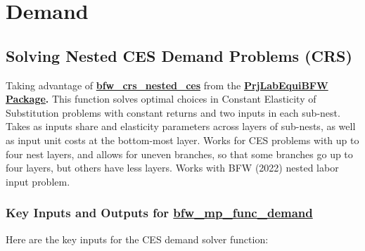 \documentclass[
]{book}
\begin{document}
\hypertarget{demand}{%
\chapter{Demand}\label{demand}}

\hypertarget{solving-nested-ces-demand-problems-crs}{%
\section{Solving Nested CES Demand Problems (CRS)}\label{solving-nested-ces-demand-problems-crs}}

Taking advantage of
\href{https://github.com/FanWangEcon/PrjLabEquiBFW/blob/main/PrjLabEquiBFW/solvedemand/bfw_crs_nested_ces.m}{\textbf{bfw\_crs\_nested\_ces}}
from the \href{https://fanwangecon.github.io/PrjLabEquiBFW/}{\textbf{PrjLabEquiBFW
Package}}\textbf{.} This
function solves optimal choices in Constant Elasticity of Substitution
problems with constant returns and two inputs in each sub-nest. Takes as
inputs share and elasticity parameters across layers of sub-nests, as
well as input unit costs at the bottom-most layer. Works for CES
problems with up to four nest layers, and allows for uneven branches, so
that some branches go up to four layers, but others have less layers.
Works with BFW (2022) nested labor input problem.

\hypertarget{key-inputs-and-outputs-for-bfw_mp_func_demand}{%
\subsection{\texorpdfstring{Key Inputs and Outputs for \href{https://github.com/FanWangEcon/PrjLabEquiBFW/tree/main/PrjLabEquiBFW/func/bfw_mp_func_demand.m}{\textbf{bfw\_mp\_func\_demand}}}{Key Inputs and Outputs for bfw\_mp\_func\_demand}}\label{key-inputs-and-outputs-for-bfw_mp_func_demand}}

Here are the key inputs for the CES demand solver function:
\end{document}
